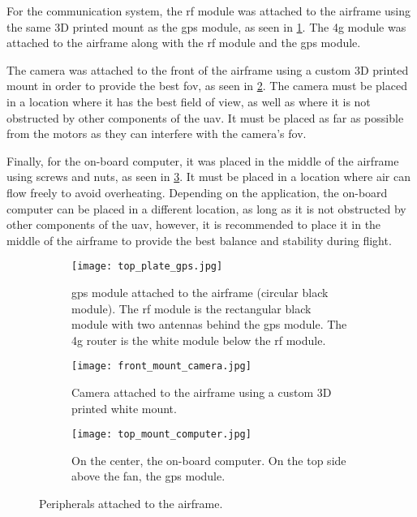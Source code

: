 For the communication system, the \gls{rf} module was attached to the airframe using the same 3D printed mount as the \gls{gps} module, as seen in \cref{fig:gps_attached_to_airframe}. The \gls{4g} module was attached to the airframe along with the \gls{rf} module and the \gls{gps} module.

The camera was attached to the front of the airframe using a custom 3D printed mount in order to provide the best \gls{fov}, as seen in \cref{fig:camera_attached_to_airframe}. The camera must be placed in a location where it has the best field of view, as well as where it is not obstructed by other components of the \gls{uav}. It must be placed as far as possible from the motors as they can interfere with the camera's \gls{fov}.

Finally, for the on-board computer, it was placed in the middle of the airframe using screws and nuts, as seen in \cref{fig:computer_attached_to_airframe}. It must be placed in a location where air can flow freely to avoid overheating. Depending on the application, the on-board computer can be placed in a different location, as long as it is not obstructed by other components of the \gls{uav}, however, it is recommended to place it in the middle of the airframe to provide the best balance and stability during flight.

\begin{figure}
  \hfill
  \begin{subfigure}[t]{0.3\linewidth}
    \texttt{[image: top\_plate\_gps.jpg]}
    \caption{\gls{gps} module attached to the airframe (circular black module). The \gls{rf} module is the rectangular black module with two antennas behind the \gls{gps} module. The \gls{4g} router is the white module below the \gls{rf} module.}\label{fig:gps_attached_to_airframe}
  \end{subfigure}
  \hfill
  \begin{subfigure}[t]{0.3\linewidth}
    \texttt{[image: front\_mount\_camera.jpg]}
    \caption{Camera attached to the airframe using a custom 3D printed white mount.}\label{fig:camera_attached_to_airframe}
  \end{subfigure}
  \hfill
  \begin{subfigure}[t]{0.3\linewidth}
    \texttt{[image: top\_mount\_computer.jpg]}
    \caption{On the center, the on-board computer. On the top side above the fan, the \gls{gps} module.}\label{fig:computer_attached_to_airframe}
  \end{subfigure}
  \hfill

  \caption{Peripherals attached to the airframe.}\label{fig:peripherals_attached_to_airframe}
\end{figure}

